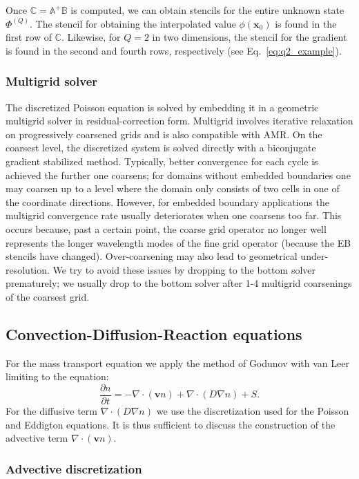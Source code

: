 \documentclass[3p]{elsarticle}
\begin{document}
Once $\mathbb{C} = \mathbb{A}^+\mathbb{B}$ is computed, we can obtain stencils for the entire unknown state $\Phi^{(Q)}$. The stencil for obtaining the interpolated value $\phi(\bm{x}_0)$ is found in the first row of $\mathbb{C}$. Likewise, for $Q=2$ in two dimensions, the stencil for the gradient is found in the second and fourth rows, respectively (see Eq.~\eqref{eq:q2_example}). 

\subsubsection{Multigrid solver}
The discretized Poisson equation is solved by embedding it in a geometric multigrid solver in residual-correction form. Multigrid involves iterative relaxation on progressively coarsened grids and is also compatible with AMR. On the coarsest level, the discretized system is solved directly with a biconjugate gradient stabilized method. Typically, better convergence for each cycle is achieved the further one coarsens; for domains without embedded boundaries one may coarsen up to a level where the domain only consists of two cells in one of the coordinate directions. However, for embedded boundary applications the multigrid convergence rate usually deteriorates when one coarsens too far. This occurs because, past a certain point, the coarse grid operator no longer well represents the longer wavelength modes of the fine grid operator (because the EB stencils have changed). Over-coarsening may also lead to geometrical under-resolution. We try to avoid these issues by dropping to the bottom solver prematurely; we usually drop to the bottom solver after 1-4 multigrid coarsenings of the coarsest grid. 

\subsection{Convection-Diffusion-Reaction equations}
For the mass transport equation we apply the method of Godunov with van Leer limiting to the equation:
\begin{equation}
  \frac{\partial n}{\partial t} = - \nabla\cdot(\bm{v}n) + \nabla\cdot\left(D\nabla n\right) + S.
\end{equation}
For the diffusive term $\nabla\cdot\left(D\nabla n\right)$ we use the discretization used for the Poisson and Eddigton equations. It is thus sufficient to discuss the construction of the advective term $\nabla\cdot(\bm{v}n)$. 

\subsubsection{Advective discretization}
\end{document}
